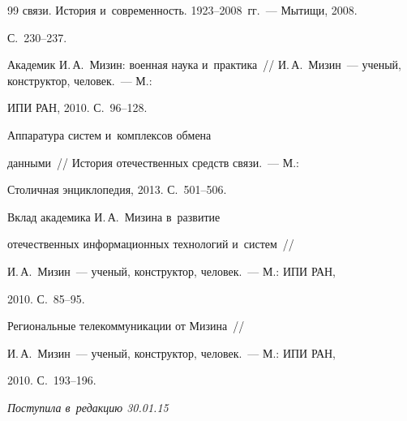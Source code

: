 {{\begin{thebibliography}{99}
связи. История и~современность. 1923--2008~гг.~--- Мытищи, 2008.


С.~230--237.







 Академик И.\,А.~Мизин: военная наука и~практика~/\!\!/ И.\,А.~Мизин~--- ученый, конструктор, человек.~--- М.:


ИПИ РАН, 2010. С.~96--128.










 Аппаратура систем и~комплексов обмена


данными~/\!\!/ История отечественных средств связи.~--- М.:


Столичная энциклопедия, 2013. С.~501--506.




 Вклад академика И.\,А.~Мизина в~развитие


отечественных информационных технологий и~систем~/\!\!/


И.\,А.~Мизин~--- ученый, конструктор, человек.~--- М.: ИПИ РАН,


2010. С.~85--95.







 Региональные телекоммуникации от Мизина~/\!\!/


И.\,А.~Мизин~--- ученый, конструктор, человек.~--- М.: ИПИ РАН,


2010. С.~193--196.





\end{thebibliography}


} }








\vspace*{-3pt}





\hfill{\small\textit{Поступила в~редакцию 30.01.15}}








